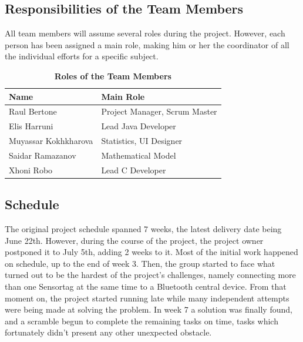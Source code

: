 \documentclass[hidelinks,conference,12pt]{IEEETran}
\begin{document}
\subsection{Responsibilities of the Team Members}

All team members will assume several roles during the project. However, each person has been assigned a main role, making him or her the coordinator of all the individual efforts for a specific subject. 
\FloatBarrier
\begin{table}[h]
	\centering
	\caption{\textbf{Roles of the Team Members}}
	{\renewcommand{\arraystretch}{2}%
		\begin{tabular}{ | l | l | }
			\hline
			\textbf{Name} & \textbf{Main Role} \\ \hline
			Raul Bertone & Project Manager, Scrum Master \\ \hline
			Elis Harruni & Lead Java Developer \\ \hline
			Muyassar Kokhkharova & Statistics, UI Designer \\ \hline
			Saidar Ramazanov & Mathematical Model \\ \hline
			Xhoni Robo & Lead C Developer \\ \hline
	\end{tabular}}
\end{table} 

\subsection{Schedule}
The original project schedule spanned 7 weeks, the latest delivery date being June 22th. However, during the course of the project, the project owner postponed it to July 5th, adding 2 weeks to it.
Most of the initial work happened on schedule, up to the end of week 3. Then, the group started to face what turned out to be the hardest of the project’s challenges, namely connecting more than one Sensortag at the same time to a Bluetooth central device. From that moment on, the project started running late while many independent attempts were being made at solving the problem. In week 7 a solution was finally found, and a scramble begun to complete the remaining tasks on time, tasks which fortunately didn’t present any other unexpected obstacle.

\clearpage
\FloatBarrier
\end{document}
